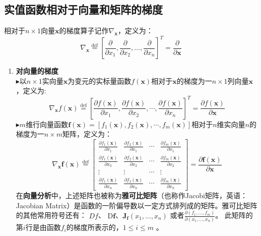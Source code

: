 \documentclass[UTF8]{ctexart}
\begin{document}
{\subsection{实值函数相对于向量和矩阵的梯度}
相对于$n \times 1$向量$\boldsymbol {x}$的梯度算子记作$\nabla_{\boldsymbol{x}}$，定义为：
\begin{equation}
	 \nabla _{\boldsymbol {x}}\overset {\mathrm {def}}{=}[\frac{\partial}{\partial x_1}, \frac{\partial}{\partial x_2}, \ldots, \frac{\partial}{\partial x_n}]^{T}=\frac{\partial}{\partial \boldsymbol{x}}
\end{equation}
\begin{enumerate}
	\item \textbf{对向量的梯度}\\
	$\blacktriangleright$以$n \times 1$实向量$\boldsymbol {x}$为变元的实标量函数$f(\boldsymbol {x})$相对于$\boldsymbol {x}$的梯度为一$n \times 1$列向量$\boldsymbol {x}$，定义为:
	\begin{equation}
		\nabla _{\boldsymbol {x}}f(\boldsymbol {x}) \overset {\mathrm {def}}{=}[\frac{\partial f(\boldsymbol {x})}{\partial x_1}, \frac{\partial f(\boldsymbol {x})}{\partial x_2}, \cdots, \frac{\partial f(\boldsymbol {x})}{\partial x_n}]^{T}=\frac{\partial f(\boldsymbol {x})}{\partial \boldsymbol{x}}
	\end{equation}
	$\blacktriangleright m$维行向量函数\( {\boldsymbol {f}}({\boldsymbol {x}})=[f_{1}({\boldsymbol {x}}),f_{2}({\boldsymbol {x}}),\cdots ,f_{m}({\boldsymbol {x}})]\)相对于$n$维实向量$n$的梯度为一$n \times m$矩阵，定义为：
	\begin{equation}
		\nabla _{\boldsymbol {x}}\boldsymbol{f}(\boldsymbol {x}) \overset {\mathrm {def}}{=}\left[
		\begin{matrix}
			\frac{\partial f_1(\boldsymbol {x})}{\partial x_1}&\frac{\partial f_2(\boldsymbol {x})}{\partial x_1}&\cdots &\frac{\partial f_m(\boldsymbol {x})}{\partial x_1}\\
			\frac{\partial f_1(\boldsymbol {x})}{\partial x_2}&\frac{\partial f_2(\boldsymbol {x})}{\partial x_2}&\cdots &\frac{\partial f_m(\boldsymbol {x})}{\partial x_2}\\
			\vdots & \vdots & \cdots & \vdots\\
			\frac{\partial f_1(\boldsymbol {x})}{\partial x_n}&\frac{\partial f_2(\boldsymbol {x})}{\partial x_n}&\cdots &\frac{\partial f_m(\boldsymbol {x})}{\partial x_n}
		\end{matrix}
		    \right]=\frac{\partial \boldsymbol{f}(\boldsymbol {x})}{\partial \boldsymbol{x}}
	\end{equation}在\textbf{向量分析}中，上述矩阵也被称为\textbf{雅可比矩阵}（也称作Jacobi矩阵，英语：Jacobian Matrix）是函数的一阶偏导数以一定方式排列成的矩阵。雅可比矩阵的其他常用符号还有：
$Df$、 $\mathrm {D} \mathbf {f}$、$\mathbf {J} _{\mathbf {f} }(x_{1},\ldots ,x_{n})$ 或者${\frac {\partial (f_{1},\ldots ,f_{m})}{\partial (x_{1},\ldots ,x_{n})}}$。
此矩阵的第$i$行是由函数$f_{i}$的梯度所表示的，$ 1 \leqslant i \leqslant m$ 。


\end{enumerate}}
\end{document}
